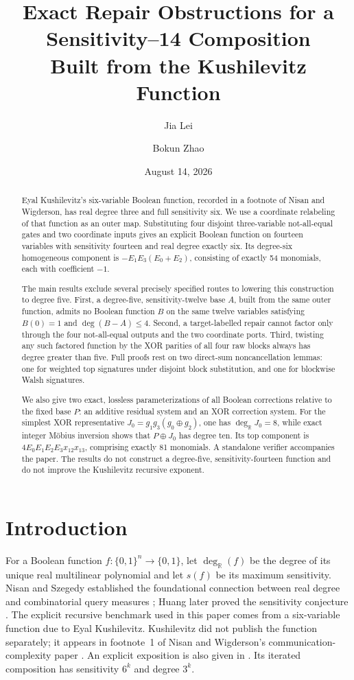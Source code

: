 \documentclass[11pt]{article}
\title{Exact Repair Obstructions for a Sensitivity--14 Composition\\
Built from the Kushilevitz Function}
\author{Jia Lei \and Bokun Zhao}
\date{August 14, 2026}
\theoremstyle{definition}
\newcommand{\cube}[1]{\{0,1\}^{#1}}
\newcommand{\R}{\mathbb R}
\begin{document}
\maketitle

\begin{abstract}
Eyal Kushilevitz's six-variable Boolean function, recorded in a footnote of
Nisan and Wigderson, has real degree three and full sensitivity six.  We use a
coordinate relabeling of that function as an outer map.  Substituting four
disjoint three-variable not-all-equal gates and two coordinate inputs gives an
explicit Boolean function on fourteen variables with sensitivity fourteen and
real degree exactly six.  Its degree-six homogeneous component is
\(-E_1E_3(E_0+E_2)\), consisting of exactly 54 monomials, each with
coefficient \(-1\).

The main results exclude several precisely specified routes to lowering this
construction to degree five.  First, a degree-five, sensitivity-twelve base
\(A\), built from the same outer function, admits no Boolean function \(B\) on
the same twelve variables satisfying \(B(0)=1\) and \(\deg(B-A)\le4\).  Second, a target-labelled
repair cannot factor only through the four not-all-equal outputs and the two
coordinate ports.  Third, twisting any such factored function by the XOR
parities of all four raw blocks always has degree greater than five.  Full
proofs rest on two direct-sum noncancellation lemmas: one for weighted top
signatures under disjoint block substitution, and one for blockwise Walsh
signatures.

We also give two exact, lossless parameterizations of all Boolean corrections
relative to the fixed base \(P\): an additive residual system and an XOR
correction system.  For the simplest XOR representative
\(J_0=g_1g_3(g_0\oplus g_2)\), one has \(\deg_{\mathbb R}J_0=8\), while exact
integer M\"obius inversion shows that \(P\oplus J_0\) has degree ten.  Its top
component is \(4E_0E_1E_2E_3x_{12}x_{13}\), comprising exactly 81 monomials.
A standalone verifier accompanies the paper.  The results do not construct a
degree-five, sensitivity-fourteen function and do not improve the Kushilevitz
recursive exponent.
\end{abstract}

\section{Introduction}

For a Boolean function \(f:\cube n\to\{0,1\}\), let
\(\deg_{\R}(f)\) be the degree of its unique real multilinear polynomial and
let \(s(f)\) be its maximum sensitivity.  Nisan and Szegedy established the
foundational connection between real degree and combinatorial query measures
\cite{NisanSzegedy1994}; Huang later proved the sensitivity conjecture
\cite{Huang2019}.  The explicit recursive benchmark used in this paper comes
from a six-variable function due to Eyal Kushilevitz.  Kushilevitz did not
publish the function separately; it appears in footnote~1 of Nisan and
Wigderson's communication-complexity paper \cite{NisanWigderson1995}.  An
explicit exposition is also given in \cite{HatamiKulkarniPankratov2011}.  Its
iterated composition has sensitivity \(6^k\) and degree \(3^k\).
\end{document}

